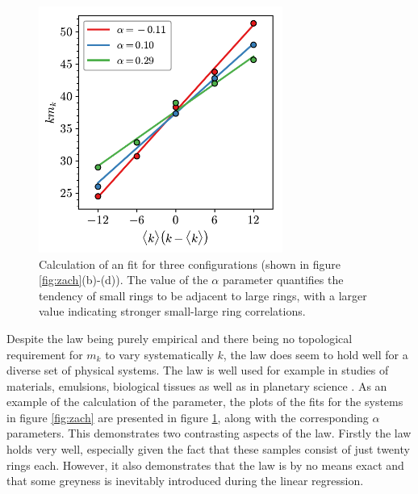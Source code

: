 \begin{figure}[tb]
     \centering
      \includegraphics[width=8cm]{./figures/methods/aw_demo.pdf}
     \caption{Calculation of an \aw{} fit for three configurations (shown in figure \ref{fig:zach}(b)\--(d)). The value of the $\alpha$ parameter quantifies the tendency of small rings to be adjacent to large rings, with a larger value indicating stronger small\--large ring correlations.}
     \label{fig:awdemo}
\end{figure}

Despite the \aw{} law being purely empirical and there being no topological requirement for $m_k$ to vary systematically $k$, the law does seem to hold well for a diverse set of physical systems.
The law is well used for example in studies of materials, emulsions, biological tissues as well as in planetary science \cite{LeRoux2013,Roy2018,Noever1992,Mombach1993,Pedro2008}.
As an example of the calculation of the \aw{} parameter, the plots of the fits for the systems in figure \ref{fig:zach} are presented in figure \ref{fig:awdemo}, along with the corresponding $\alpha$ parameters.
This demonstrates two contrasting aspects of the \aw{} law. 
Firstly the law holds very well, especially given the fact that these samples consist of just twenty rings each.
However, it also demonstrates that the law is by no means exact and that some greyness is inevitably introduced during the linear regression.

